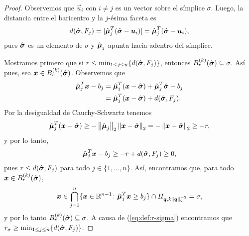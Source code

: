 \begin{proof}
	Observemos que $\vec{u}_i$ con $i \neq j$ es un vector sobre el símplice $\sigma$. Luego, la
	distancia entre el baricentro y la $j$-ésima faceta es
	\begin{equation*}
		d(\hat{\boldsymbol{ \sigma }}, F_j) = |\hat{\boldsymbol{ \mu }}_j^T(\hat{\boldsymbol{ \sigma }} - \boldsymbol{u}_i)|
		= \hat{\boldsymbol{ \mu }}_j^T(\hat{\boldsymbol{ \sigma }} - \boldsymbol{u}_i),
	\end{equation*}
	pues $\hat{\boldsymbol{ \sigma }}$ es un elemento de $\sigma$ y $\hat{\boldsymbol{ \mu }}_j$ apunta hacia adentro
	del símplice.

	Mostramos primero que si $r \leq \min_{1 \leq j \leq n} \lbrace d(\hat{\boldsymbol{ \sigma }}, F_j) \rbrace$, entonces
	$B_r^{(k)}(\hat{\boldsymbol{ \sigma }}) \subseteq \sigma$. Así pues, sea $\boldsymbol{x} \in
	B_r^{(k)}(\hat{\boldsymbol{ \sigma }})$. Observemos que
	\begin{align*}
		\hat{\boldsymbol{ \mu }}_j^T\boldsymbol{x} - b_j
		&=
		\hat{\boldsymbol{ \mu }}_j^T(\boldsymbol{x} - \hat{\boldsymbol{ \sigma }}) + \hat{\boldsymbol{ \mu }}_j^T\hat{\boldsymbol{ \sigma }} -
		b_j \\
		&= \hat{\boldsymbol{ \mu }}_j^T(\boldsymbol{x} - \hat{\boldsymbol{ \sigma }}) + d(\hat{\boldsymbol{ \sigma }}, F_j).
	\end{align*}
	Por la desigualdad de Cauchy-Schwartz tenemos
	\begin{equation*}
		\hat{\boldsymbol{ \mu }}_j^T(\boldsymbol{x} - \hat{\boldsymbol{ \sigma }}) \geq -\left\lVert \hat{\boldsymbol{ \mu }}_j \right\rVert_2\left\lVert \boldsymbol{x} -
		\hat{\boldsymbol{ \sigma }} \right\rVert_2 = -\left\lVert \boldsymbol{x} - \hat{\boldsymbol{ \sigma }} \right\rVert_2 \geq -r,
	\end{equation*}
	y por lo tanto,
	\begin{equation*}
		\hat{\boldsymbol{ \mu }}_j^T\boldsymbol{x} - b_j \geq -r + d(\hat{\boldsymbol{ \sigma }}, F_j) \geq 0,
	\end{equation*}
	pues $r \leq d(\hat{\boldsymbol{ \sigma }}, F_j)$ para todo $j \in \lbrace 1, \ldots, n \rbrace$. Así,
	encontramos que, para todo $\boldsymbol{x} \in B_r^{(k)}(\hat{\boldsymbol{ \sigma }})$,
	\begin{equation*}
		\boldsymbol{x} \in
		\bigcap_{j=1}^{n} \lbrace \boldsymbol{x} \in \mathbb{R}^{n-1} \colon \hat{\boldsymbol{ \mu }}^T_j\boldsymbol{x} \geq b_j \rbrace
		\cap H_{\boldsymbol{q}, k\left\lVert \boldsymbol{q} \right\rVert_2^{-2}} = \sigma,
	\end{equation*}
	y por lo tanto $B_r^{(k)}(\hat{\boldsymbol{ \sigma }}) \subseteq \sigma$. A causa de
	(\ref{eq:def:r-sigma}) encontramos que $r_\sigma \geq \min_{1 \leq j \leq n} \lbrace
	d(\hat{\boldsymbol{ \sigma }}, F_j) \rbrace$.


\end{proof}
